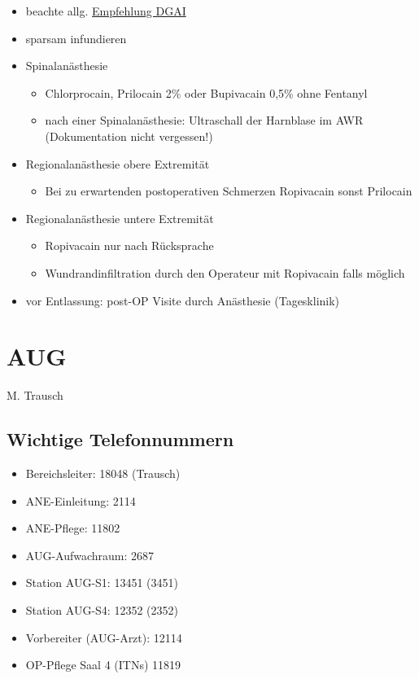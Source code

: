 \documentclass[
]{book}
\providecommand{\tightlist}{%
  \setlength{\itemsep}{0pt}\setlength{\parskip}{0pt}}
\begin{document}
\begin{itemize}
\tightlist
\item
  beachte allg. \href{https://www.reanitrain.de/downloads/leitlinien/operative\%20Eingriffe/ambulante\%20OPs\%20-\%20zahnaerztliche\%20Eingriffe/Leitlinie\%20fuer\%20ambulantes\%20Operieren\%20bzw.Tageschirurgie.pdf}{Empfehlung DGAI}
\item
  sparsam infundieren
\item
  Spinalanästhesie

  \begin{itemize}
  \tightlist
  \item
    Chlorprocain, Prilocain 2\% oder Bupivacain 0,5\% ohne Fentanyl
  \item
    nach einer Spinalanästhesie: Ultraschall der Harnblase im AWR (Dokumentation nicht vergessen!)
  \end{itemize}
\item
  Regionalanästhesie obere Extremität

  \begin{itemize}
  \tightlist
  \item
    Bei zu erwartenden postoperativen Schmerzen Ropivacain sonst Prilocain
  \end{itemize}
\item
  Regionalanästhesie untere Extremität

  \begin{itemize}
  \tightlist
  \item
    Ropivacain nur nach Rücksprache
  \item
    Wundrandinfiltration durch den Operateur mit Ropivacain falls möglich
  \end{itemize}
\item
  vor Entlassung: post-OP Visite durch Anästhesie (Tagesklinik)
\end{itemize}

\hypertarget{aug}{%
\chapter{AUG}\label{aug}}

M. Trausch

\hypertarget{wichtige-telefonnummern-1}{%
\section{Wichtige Telefonnummern}\label{wichtige-telefonnummern-1}}

\begin{itemize}
\tightlist
\item
  Bereichsleiter: 18048 (Trausch)
\item
  ANE-Einleitung: 2114
\item
  ANE-Pflege: 11802
\item
  AUG-Aufwachraum: 2687
\item
  Station AUG-S1: 13451 (3451)
\item
  Station AUG-S4: 12352 (2352)
\item
  Vorbereiter (AUG-Arzt): 12114
\item
  OP-Pflege Saal 4 (ITNs) 11819
\end{itemize}
\end{document}
